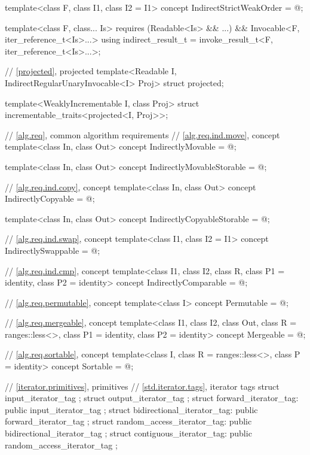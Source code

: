 \begin{codeblock}
{  template<class F, class I1, class I2 = I1>
    concept IndirectStrictWeakOrder = @\seebelow@;

  template<class F, class... Is>
    requires (Readable<Is> && ...) && Invocable<F, iter_reference_t<Is>...>
      using indirect_result_t = invoke_result_t<F, iter_reference_t<Is>...>;

  // \ref{projected}, projected
  template<Readable I, IndirectRegularUnaryInvocable<I> Proj>
    struct projected;

  template<WeaklyIncrementable I, class Proj>
    struct incrementable_traits<projected<I, Proj>>;

  // \ref{alg.req}, common algorithm requirements
  // \ref{alg.req.ind.move}, concept 
  template<class In, class Out>
    concept IndirectlyMovable = @\seebelow@;

  template<class In, class Out>
    concept IndirectlyMovableStorable = @\seebelow@;

  // \ref{alg.req.ind.copy}, concept 
  template<class In, class Out>
    concept IndirectlyCopyable = @\seebelow@;

  template<class In, class Out>
    concept IndirectlyCopyableStorable = @\seebelow@;

  // \ref{alg.req.ind.swap}, concept 
  template<class I1, class I2 = I1>
    concept IndirectlySwappable = @\seebelow@;

  // \ref{alg.req.ind.cmp}, concept 
  template<class I1, class I2, class R, class P1 = identity, class P2 = identity>
    concept IndirectlyComparable = @\seebelow@;

  // \ref{alg.req.permutable}, concept 
  template<class I>
    concept Permutable = @\seebelow@;

  // \ref{alg.req.mergeable}, concept 
  template<class I1, class I2, class Out,
      class R = ranges::less<>, class P1 = identity, class P2 = identity>
    concept Mergeable = @\seebelow@;

  // \ref{alg.req.sortable}, concept 
  template<class I, class R = ranges::less<>, class P = identity>
    concept Sortable = @\seebelow@;

  // \ref{iterator.primitives}, primitives
  // \ref{std.iterator.tags}, iterator tags
  struct input_iterator_tag { };
  struct output_iterator_tag { };
  struct forward_iterator_tag: public input_iterator_tag { };
  struct bidirectional_iterator_tag: public forward_iterator_tag { };
  struct random_access_iterator_tag: public bidirectional_iterator_tag { };
  struct contiguous_iterator_tag: public random_access_iterator_tag { };

}
\end{codeblock}
